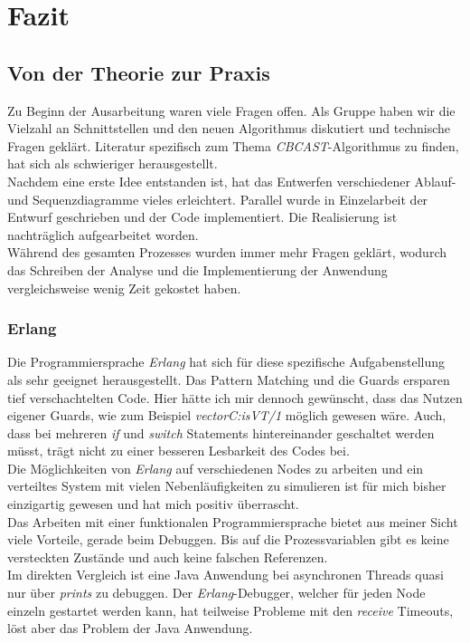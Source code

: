 \section{Fazit}

\subsection{Von der Theorie zur Praxis}

Zu Beginn der Ausarbeitung waren viele Fragen offen. Als Gruppe haben wir die Vielzahl an Schnittstellen und den neuen Algorithmus diskutiert und technische Fragen geklärt. Literatur spezifisch zum Thema \textit{CBCAST}-Algorithmus zu finden, hat sich als schwieriger herausgestellt.\\
Nachdem eine erste Idee entstanden ist, hat das Entwerfen verschiedener Ablauf- und Sequenzdiagramme vieles erleichtert. Parallel wurde in Einzelarbeit der Entwurf geschrieben und der Code implementiert. Die Realisierung ist nachträglich aufgearbeitet worden.\\
Während des gesamten Prozesses wurden immer mehr Fragen geklärt, wodurch das Schreiben der Analyse und die Implementierung der Anwendung vergleichsweise wenig Zeit gekostet haben.

\subsubsection{Erlang}

Die Programmiersprache \textit{Erlang} hat sich für diese spezifische Aufgabenstellung als sehr geeignet herausgestellt. Das Pattern Matching und die Guards ersparen tief verschachtelten Code. Hier hätte ich mir dennoch gewünscht, dass das Nutzen eigener Guards, wie zum Beispiel \textit{vectorC:isVT/1} möglich gewesen wäre. Auch, dass bei mehreren \textit{if} und \textit{switch} Statements hintereinander geschaltet werden müsst, trägt nicht zu einer besseren Lesbarkeit des Codes bei.\\
Die Möglichkeiten von \textit{Erlang} auf verschiedenen Nodes zu arbeiten und ein verteiltes System mit vielen Nebenläufigkeiten zu simulieren ist für mich bisher einzigartig gewesen und hat mich positiv überrascht.\\
Das Arbeiten mit einer funktionalen Programmiersprache bietet aus meiner Sicht viele Vorteile, gerade beim Debuggen. Bis auf die Prozessvariablen gibt es keine versteckten Zustände und auch keine falschen Referenzen.\\
Im direkten Vergleich ist eine Java Anwendung bei asynchronen Threads quasi nur über \textit{prints} zu debuggen. Der \textit{Erlang}-Debugger, welcher für jeden Node einzeln gestartet werden kann, hat teilweise Probleme mit den \textit{receive} Timeouts, löst aber das Problem der Java Anwendung.

